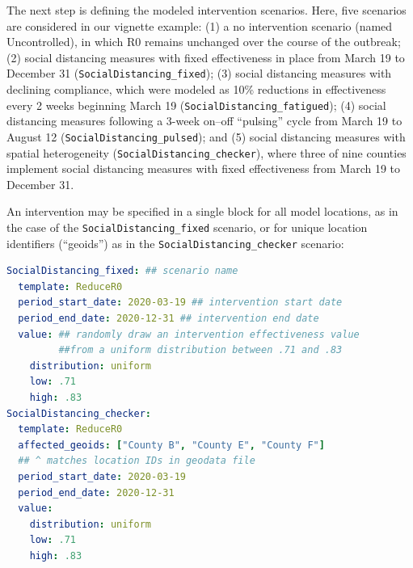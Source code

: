 The next step is defining the modeled intervention scenarios. Here, five scenarios are considered in our vignette example: (1) a no intervention scenario (named Uncontrolled), in which R0 remains unchanged over the course of the outbreak; (2) social distancing measures with fixed effectiveness in place from March 19 to December 31 (\verb|SocialDistancing_fixed|); (3) social distancing measures with declining compliance, which were modeled as 10\% reductions in effectiveness every 2 weeks beginning March 19 (\verb|SocialDistancing_fatigued|); (4) social distancing measures following a 3-week on–off “pulsing” cycle from March 19 to August 12 (\verb|SocialDistancing_pulsed|); and (5) social distancing measures with spatial heterogeneity (\verb|SocialDistancing_checker|), where three of nine counties implement social distancing measures with fixed effectiveness from March 19 to December 31.


An intervention may be specified in a single block for all model locations, as in the case of the \verb|SocialDistancing_fixed| scenario, or for unique location identifiers (“geoids”) as in the \verb|SocialDistancing_checker| scenario:
\begin{lstlisting}[language=yaml]
SocialDistancing_fixed: ## scenario name 
  template: ReduceR0 
  period_start_date: 2020-03-19 ## intervention start date 
  period_end_date: 2020-12-31 ## intervention end date 
  value: ## randomly draw an intervention effectiveness value 
         ##from a uniform distribution between .71 and .83 
    distribution: uniform 
    low: .71 
    high: .83 
SocialDistancing_checker: 
  template: ReduceR0 
  affected_geoids: ["County B", "County E", "County F"] 
  ## ^ matches location IDs in geodata file 
  period_start_date: 2020-03-19 
  period_end_date: 2020-12-31 
  value: 
    distribution: uniform 
    low: .71
    high: .83
\end{lstlisting}

